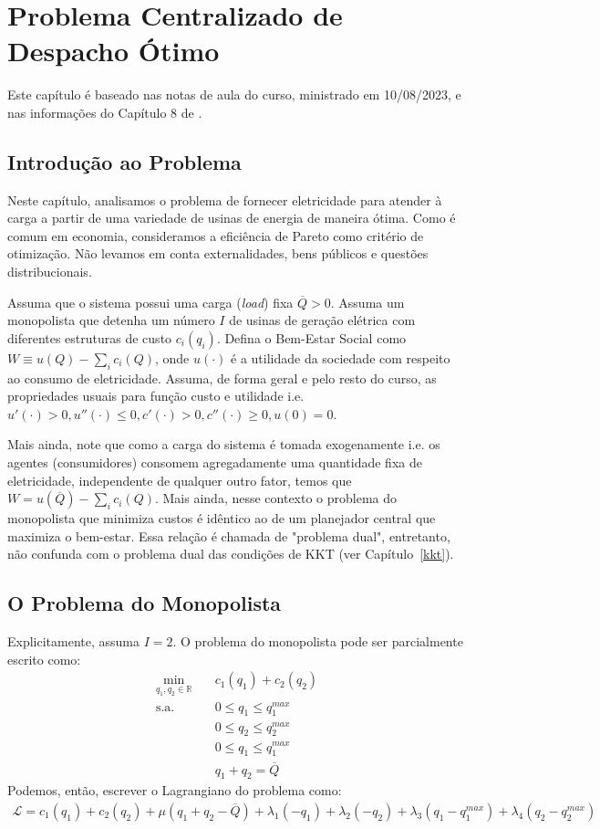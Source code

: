 \chapter{Problema Centralizado de Despacho Ótimo}
\localtableofcontents 

Este capítulo é baseado nas notas de aula do curso, ministrado em 10/08/2023, e nas informações do Capítulo 8 de \textcite{cretì_fontini_2019}.

\section{Introdução ao Problema}
Neste capítulo, analisamos o problema de fornecer eletricidade para atender à carga a partir de uma variedade de usinas de energia de maneira ótima. Como é comum em economia, consideramos a eficiência de Pareto como critério de otimização. Não levamos em conta externalidades, bens públicos e questões distribucionais.

Assuma que o sistema possui uma carga (\textit{load}) fixa $\overline{Q}>0$. Assuma um monopolista que detenha um número $I$ de usinas de geração elétrica com diferentes estruturas de custo $c_i(q_i)$. Defina o Bem-Estar Social como $W \equiv u(Q)-\sum_ic_i(Q)$, onde $u(\cdot)$ é a utilidade da sociedade com respeito ao consumo de eletricidade. Assuma, de forma geral e pelo resto do curso, as propriedades usuais para função custo e utilidade i.e. $u'(\cdot)>0, u''(\cdot)\le0,c'(\cdot)>0,c''(\cdot)\ge0,u(0)=0$.

Mais ainda, note que como a carga do sistema é tomada exogenamente i.e. os agentes (consumidores) consomem agregadamente uma quantidade fixa de eletricidade, independente de qualquer outro fator, temos que $W=u(\overline{Q})-\sum_ic_i(Q)$. Mais ainda, nesse contexto o problema do monopolista que minimiza custos é idêntico ao de um planejador central que maximiza o bem-estar. Essa relação é chamada de "problema dual", entretanto, não confunda com o problema dual das condições de KKT (ver Capítulo~\ref{kkt}).
\section{O Problema do Monopolista}
Explicitamente, assuma $I=2$. O problema do monopolista pode ser parcialmente escrito como:
\begin{align*}
    \min_{q_1,q_2\in\mathbb{R}}&\quad c_1(q_1) + c_2(q_2)\\
    \text{s.a.}&\quad 0\le q_1\le q_1^{max}\\
    &\quad 0\le q_2\le q_2^{max}\\
    &\quad 0\le q_1\le q_1^{max}\\
    &\quad q_1+q_2=\overline{Q}
\end{align*}
Podemos, então, escrever o Lagrangiano do problema como:
\begin{align*}
    \mathcal{L}=c_1(q_1) + c_2(q_2) +\mu(q_1+q_2-\overline{Q}) +\lambda_1 (-q_1) +\lambda_2 (-q_2) + \lambda_3(q_1-q_1^{max})+ \lambda_4(q_2-q_2^{max})    
\end{align*}

